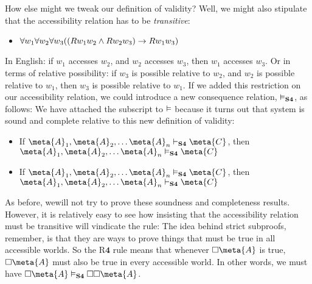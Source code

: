 How else might we tweak our definition of validity? Well, we might also stipulate that the accessibility relation has to be \emph{transitive}:
\begin{itemize}
	\item $\forall w_1\forall w_2\forall w_3 ((Rw_1w_2 \wedge Rw_2w_3)\rightarrow Rw_1w_3)$
\end{itemize}
In English: if $w_1$ accesses $w_2$, and $w_2$ accesses $w_3$, then $w_1$ accesses $w_3$. Or in terms of relative possibility: if $w_3$ is possible relative to $w_2$, and $w_2$ is possible relative to $w_1$, then $w_3$ is possible relative to $w_1$. If we added this restriction on our accessibility relation, we could introduce a new consequence relation, $\vDash_{\mathbf{S4}}$, as follows:
We have attached the \mlSfour{} subscript to $\vDash$ because it turns out that system \mlSfour{} is sound and complete relative to this new definition of validity:
\begin{itemize}
	\item If $\meta{A}_1,\meta{A}_2, \dots \meta{A}_n\proves_\mlSfour\meta{C}$, then $\meta{A}_1,\meta{A}_2, \dots \meta{A}_n\entails_\mlSfour\meta{C}$
	\item If $\meta{A}_1,\meta{A}_2, \dots \meta{A}_n\entails_\mlSfour\meta{C}$, then $\meta{A}_1,\meta{A}_2, \dots \meta{A}_n\proves_\mlSfour\meta{C}$
\end{itemize}
As before, wewill not try to prove these soundness and completeness results. However, it is relatively easy to see how insisting that the accessibility relation must be transitive will vindicate the \mlSfour{} rule:
The idea behind strict subproofs, remember, is that they are ways to prove things that must be true in all accessible worlds. So the R$\mathbf{4}$ rule means that whenever $\ebox \meta{A}$ is true, $\ebox \meta{A}$ must also be true in every accessible world. In other words, we must have $\ebox\meta{A} \entails_\mlSfour \ebox\ebox\meta{A}$.

